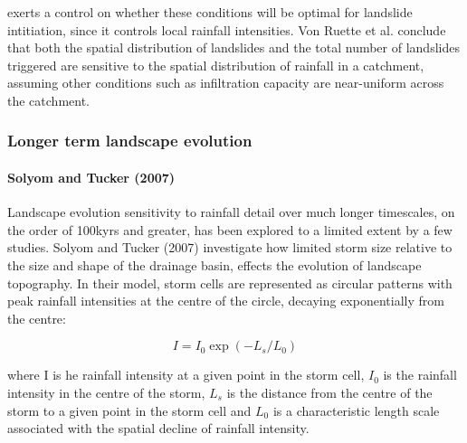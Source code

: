 exerts a control on whether these conditions will be optimal for landslide intitiation, since it controls local rainfall intensities. Von Ruette et al. conclude that both the spatial distribution of landslides and the total number of landslides triggered are sensitive to the spatial distribution of rainfall in a catchment, assuming other conditions such as infiltration capacity are near-uniform across the catchment.

\subsubsection{Longer term landscape evolution}

\paragraph{Solyom and Tucker (2007)}
Landscape evolution sensitivity to rainfall detail over much longer timescales, on the order of 100kyrs and greater, has been explored to a limited extent by a few studies. Solyom and Tucker (2007) investigate how limited storm size relative to the size and shape of the drainage basin, effects the evolution of landscape topography. In their model, storm cells are represented as circular patterns with peak rainfall intensities at the centre of the circle, decaying exponentially from the centre:

\begin{equation}
I = I_0 \exp(-L_s/L_0)
\end{equation}

where I is he rainfall intensity at a given point in the storm cell, \(I_0\) is the rainfall intensity in the centre of the storm, \(L_s\) is the distance from the centre of the storm to a given point in the storm cell and \(L_0\) is a characteristic length scale associated with the spatial decline of rainfall intensity.

